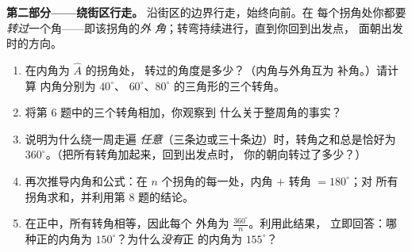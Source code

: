 \begin{problem}
\medskip
\noindent\textbf{第二部分——绕街区行走。}
沿街区的边界行走，始终向前。在
每个拐角处你都要\emph{转过}一个角——即该拐角的\emph{外
角}；转弯持续进行，直到你回到出发点，
面朝出发时的方向。
\begin{enumerate}[resume]
  \item 在内角为 $\widehat A$ 的拐角处，
        转过的角度是多少？（内角与外角互为
        补角。）请计算
        内角分别为 $40^\circ$、
        $60^\circ$、$80^\circ$ 的三角形的三个转角。
  \item 将第 6 题中的三个转角相加，你观察到
        什么关于整周角的事实？
  \item 说明为什么绕一周走遍
        \emph{任意}（三条边或三十条边）时，转角之和总是恰好为
        $360^\circ$。（把所有转角加起来，回到出发点时，
        你的朝向转过了多少？）
  \item 再次推导内角和公式：在
        $n$ 个拐角的每一处，内角 $+$ 转角 $= 180^\circ$；对
        所有拐角求和，并利用第 8 题的结论。
  \item 在正中，所有转角相等，因此每个
        外角为 $\frac{360^\circ}{n}$。利用此结果，
        立即回答：哪种正的内角为
        $150^\circ$？为什么\emph{没有}正
        的内角为 $155^\circ$？
\end{enumerate}


\end{problem}
